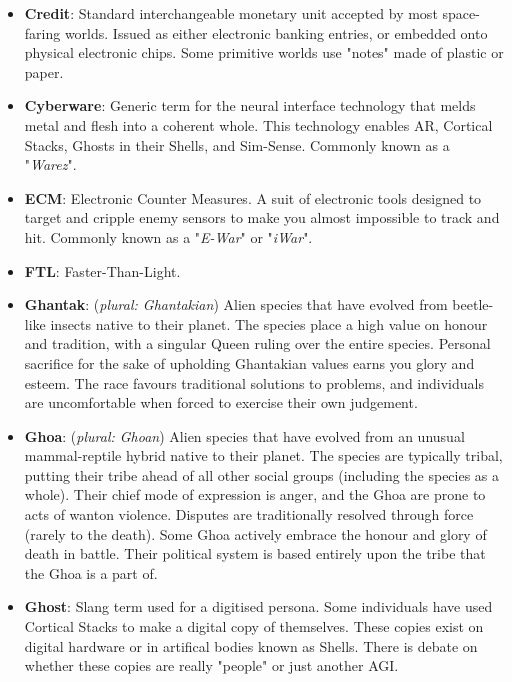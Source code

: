 \documentclass[10pt,twoside]{article}
\begin{document}
\begin{multicols}{2}
\begin{itemize}
    \item \textbf{Credit}: Standard interchangeable monetary unit accepted by most space-faring worlds. Issued as either electronic banking entries, or embedded onto physical electronic chips. Some primitive worlds use "notes" made of plastic or paper.

    \item \textbf{Cyberware}: Generic term for the neural interface technology that melds metal and flesh into a coherent whole. This technology enables AR, Cortical Stacks, Ghosts in their Shells, and Sim-Sense. Commonly known as a "\textit{Warez}".

    \item \textbf{ECM}: Electronic Counter Measures. A suit of electronic tools designed to target and cripple enemy sensors to make you almost impossible to track and hit. Commonly known as a "\textit{E-War}" or "\textit{iWar}".

    \item \textbf{FTL}: Faster-Than-Light.

    \item \textbf{Ghantak}: (\textit{plural: Ghantakian}) Alien species that have evolved from beetle-like insects native to their planet. The species place a high value on honour and tradition, with a singular Queen ruling over the entire species. Personal sacrifice for the sake of upholding Ghantakian values earns you glory and esteem. The race favours traditional solutions to problems, and individuals are uncomfortable when forced to exercise their own judgement.

    \item \textbf{Ghoa}: (\textit{plural: Ghoan}) Alien species that have evolved from an unusual mammal-reptile hybrid native to their planet. The species are typically tribal, putting their tribe ahead of all other social groups (including the species as a whole). Their chief mode of expression is anger, and the Ghoa are prone to acts of wanton violence. Disputes are traditionally resolved through force (rarely to the death). Some Ghoa actively embrace the honour and glory of death in battle. Their political system is based entirely upon the tribe that the Ghoa is a part of.

    \item \textbf{Ghost}: Slang term used for a digitised persona. Some individuals have used Cortical Stacks to make a digital copy of themselves. These copies exist on digital hardware or in artifical bodies known as Shells. There is debate on whether these copies are really "people" or just another AGI.


\end{itemize}
\end{multicols}
\end{document}
